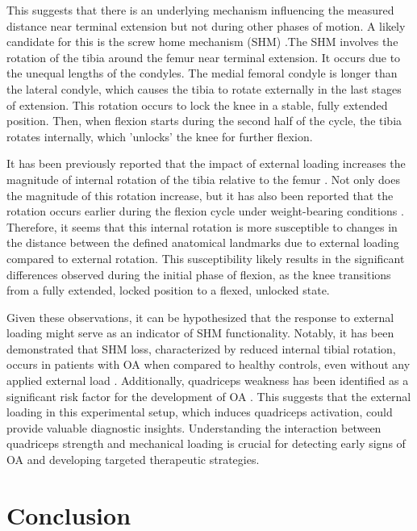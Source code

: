\documentclass{micro-econ-thesis}
\begin{document}
This suggests that there is an underlying mechanism influencing the measured distance near terminal extension but not during other phases of motion. A likely candidate for this is the screw home mechanism (SHM) \parencite{kim_screw-home_2015}.The SHM involves the rotation of the tibia around the femur near terminal extension. It occurs due to the unequal lengths of the condyles. The medial femoral condyle is longer than the lateral condyle, which causes the tibia to rotate externally in the last stages of extension.   This rotation occurs to lock the knee in a stable, fully extended position. Then, when flexion starts during the second half of the cycle, the tibia rotates internally, which 'unlocks' the knee for further flexion.

It has been previously reported that the impact of external loading increases the magnitude of internal rotation of the tibia relative to the femur \parencite{myers_vivo_2012}. Not only does the magnitude of this rotation increase, but it has also been reported that the rotation occurs earlier during the flexion cycle under weight-bearing conditions \parencite{johal_tibio-femoral_2005}. Therefore, it seems that this internal rotation is more susceptible to changes in the distance between the defined anatomical landmarks due to external loading compared to external rotation. This susceptibility likely results in the significant differences observed during the initial phase of flexion, as the knee transitions from a fully extended, locked position to a flexed, unlocked state.  

Given these observations, it can be hypothesized that the response to external loading might serve as an indicator of SHM functionality. Notably, it has been demonstrated that SHM loss, characterized by reduced internal tibial rotation, occurs in patients with OA when compared to healthy controls, even without any applied external load \parencite{jeon_alteration_2020}. Additionally, quadriceps weakness has been identified as a significant risk factor for the development of OA \parencite{segal_is_2011}. This suggests that the external loading in this experimental setup, which induces quadriceps activation, could provide valuable diagnostic insights. Understanding the interaction between quadriceps strength and mechanical loading is crucial for detecting early signs of OA and developing targeted therapeutic strategies.



 

\section{Conclusion}
\end{document}
